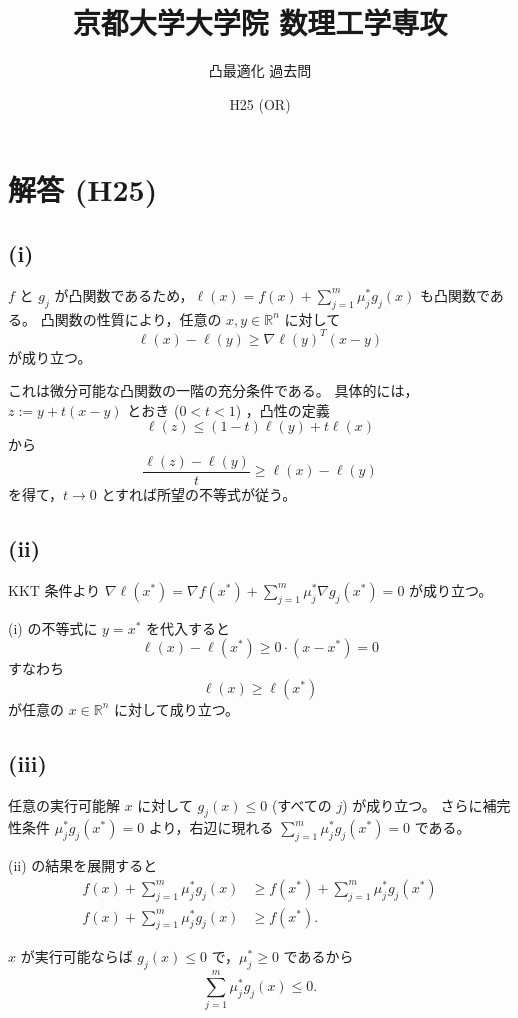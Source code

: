 \documentclass[12pt,a4paper]{article}
\title{京都大学大学院 数理工学専攻}
\author{凸最適化 過去問}
\date{H25 (OR)}
\begin{document}
\maketitle

\section*{解答 (H25)}

\subsection*{(i)}

$f$ と $g_j$ が凸関数であるため，$\ell(x)=f(x)+\sum_{j=1}^m\mu_j^*g_j(x)$ も凸関数である。
凸関数の性質により，任意の $x,y\in\mathbb{R}^n$ に対して
\[\ell(x) - \ell(y) \ge \nabla\ell(y)^T(x-y)\]
が成り立つ。

これは微分可能な凸関数の一階の充分条件である。
具体的には，$z:=y+t(x-y)$ とおき ($0<t<1$) ，凸性の定義
\[\ell(z) \le (1-t)\ell(y) + t\ell(x)\]
から
\[\frac{\ell(z)-\ell(y)}{t} \ge \ell(x) - \ell(y)\]
を得て，$t\to 0$ とすれば所望の不等式が従う。

\subsection*{(ii)}

KKT 条件より $\nabla\ell(x^*) = \nabla f(x^*) + \sum_{j=1}^m\mu_j^*\nabla g_j(x^*) = 0$ が成り立つ。

(i) の不等式に $y=x^*$ を代入すると
\[\ell(x) - \ell(x^*) \ge 0 \cdot (x-x^*) = 0\]
すなわち
\[\ell(x) \ge \ell(x^*)\]
が任意の $x\in\mathbb{R}^n$ に対して成り立つ。

\subsection*{(iii)}

任意の実行可能解 $x$ に対して $g_j(x)\le 0$ (すべての $j$) が成り立つ。
さらに補完性条件 $\mu_j^*g_j(x^*)=0$ より，右辺に現れる $\sum_{j=1}^m\mu_j^*g_j(x^*)=0$ である。

(ii) の結果を展開すると
\begin{align*}
f(x) + \sum_{j=1}^m\mu_j^*g_j(x) &\ge f(x^*) + \sum_{j=1}^m\mu_j^*g_j(x^*) \\
f(x) + \sum_{j=1}^m\mu_j^*g_j(x) &\ge f(x^*).
\end{align*}

$x$ が実行可能ならば $g_j(x)\le 0$ で，$\mu_j^*\ge 0$ であるから
\[\sum_{j=1}^m\mu_j^*g_j(x) \le 0.\]
\end{document}

